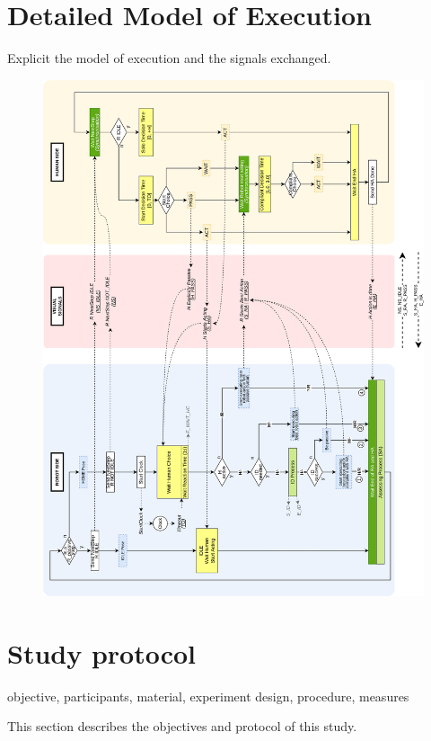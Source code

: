 \section{Detailed Model of Execution}

Explicit the model of execution and the signals exchanged.

\begin{figure}
    \centering
    \includegraphics[width=\linewidth]{images/Chapter5/detailed_automaton.png}
\end{figure}

\section{Study protocol}

objective, participants, material, experiment design, procedure, measures

This section describes the objectives and protocol of this study.  

